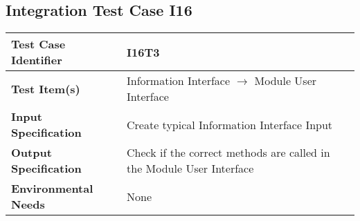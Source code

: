 \subsection{Integration Test Case I16}
\begin{tabular}{l p{9cm}}
	\hline
	\textbf{Test	Case Identifier} & I16T3 \\ \hline
	\textbf{Test	Item(s)} & Information Interface $\rightarrow$ Module User Interface \\ \hline
	\textbf{Input Specification} & Create typical Information Interface Input\\ \hline
	\textbf{Output Specification} & Check if the correct methods are called in the Module User Interface \\ \hline
	\textbf{Environmental Needs} & None \\ \hline
\end{tabular}
